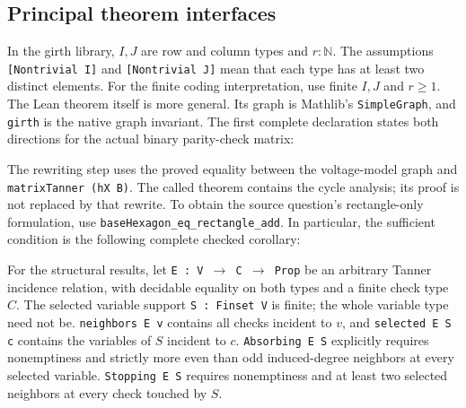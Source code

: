 \documentclass[11pt]{article}
\theoremstyle{definition}
\theoremstyle{remark}
\begin{document}
\subsection{Principal theorem interfaces}\label{sec:lean-interfaces}

In the girth library, $I,J$ are row and column types and $r:\mathbb N$.
The assumptions \texttt{[Nontrivial I]} and \texttt{[Nontrivial J]} mean
that each type has at least two distinct elements. For the finite coding
interpretation, use finite $I,J$ and $r\ge1$. The Lean theorem itself is
more general. Its graph is Mathlib's \texttt{SimpleGraph}, and
\texttt{girth} is the native graph invariant. The first complete declaration
states both directions for the actual binary parity-check matrix:
\par\medskip\noindent\begin{minipage}{\linewidth}

\end{minipage}\par\medskip
The rewriting step uses the proved equality between the voltage-model
graph and \texttt{matrixTanner (hX B)}. The called theorem contains the
cycle analysis; its proof is not replaced by that rewrite. To obtain the
source question's rectangle-only formulation, use
\texttt{baseHexagon\_eq\_rectangle\_add}. In particular, the sufficient
condition is the following complete checked corollary:
\par\medskip\noindent\begin{minipage}{\linewidth}

\end{minipage}\par\medskip

For the structural results, let \texttt{E : V \(\to\) C \(\to\) Prop}
be an arbitrary Tanner incidence relation, with decidable equality on
both types and a finite check type $C$. The selected variable support
\texttt{S : Finset V} is finite; the whole variable type need not be.
\texttt{neighbors E v} contains all checks incident to $v$, and
\texttt{selected E S c} contains the variables of $S$ incident to $c$.
\texttt{Absorbing E S} explicitly requires nonemptiness and strictly more
even than odd induced-degree neighbors at every selected variable.
\texttt{Stopping E S} requires nonemptiness and at least two selected
neighbors at every check touched by $S$.
\end{document}
